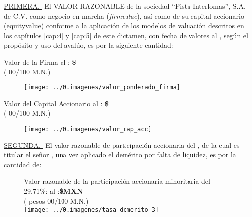 \textcolor{principal}{\underline{PRIMERA.-}} El \textcolor{principal}{VALOR RAZONABLE} de la sociedad \textcolor{principal}{``Pista Interlomas'', S.A. de C.V.} como negocio en marcha (\textit{\gls{firmvalue}}), as\'i como de su capital accionario (\gls{equityvalue}) conforme a la aplicaci\'on de los modelos de valuaci\'on descritos en los cap\'itulos \ref{cap:4} y \ref{cap:5}  de este dictamen, con fecha de valores al \fechaValores, seg\'un el prop\'osito y uso del aval\'uo, es por la siguiente cantidad:\\

\begin{center}
\textcolor{principal}{Valor de la Firma al \fechaValoresCorto:} \textbf{\$\valorFirma{} \monedaCode}\\

(\textcolor{secundario}{\valorFirmaLetra{} \moneda{} 00/100 M.N.})

\begin{figure}[H]
\centering
\texttt{[image: ../0.imagenes/valor\_ponderado\_firma]}\hspace{.5cm} 

\end{figure}


\textcolor{principal}{Valor del Capital Accionario al \fechaValoresCorto:} \textbf{\$\valorCapital{} \monedaCode}\\
(\textcolor{secundario}{\valorCapitalLetra{} \moneda{} 00/100 M.N.})\\
\end{center}

\begin{figure}[H]
\centering
 \texttt{[image: ../0.imagenes/valor\_cap\_acc]}

\end{figure}
\espacio{.5cm}

\textcolor{principal}{\underline{SEGUNDA.-}} El valor razonable de participaci\'on accionaria del \capitalAccionario{}, de la cual es titular el se\~nor \nombrePropietario, una vez aplicado el dem\'erito por falta de liquidez, es por la cantidad de:

\begin{figure}[H]
\centering
\textcolor{principal}{Valor razonable de la participación accionaria minoritaria del 29.71\%:  al \fechaValoresCorto:}\textbf{\$\valorIliquidez MXN}\\

(\textcolor{secundario}{\valorIliquidezLetra{} pesos 00/100 M.N.})\\


\texttt{[image: ../0.imagenes/tasa\_demerito\_3]}

\end{figure} 


\vspace{2cm}
